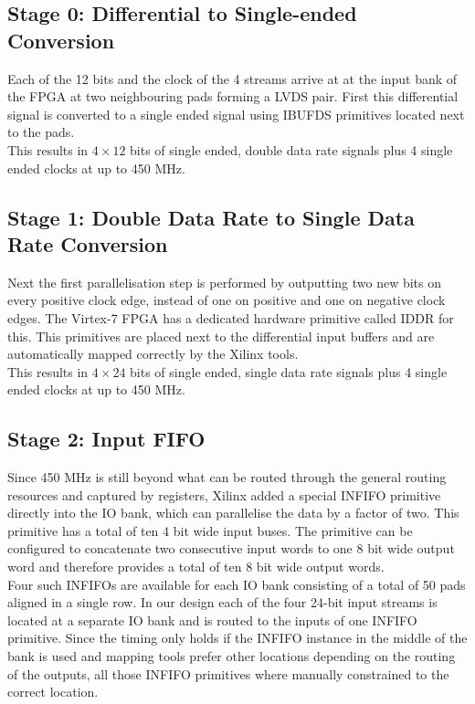 \subsection{Stage 0: Differential to Single-ended Conversion}
Each of the 12 bits and the clock of the 4 streams arrive at at the input bank
of the \gls{FPGA} at two neighbouring pads forming a \gls{LVDS} pair.
First this differential signal is converted to a single ended signal using
\gls{IBUFDS} primitives located next
to the pads. \\

This results in $4 \times 12$ bits of single ended, double data rate
signals plus 4 single ended clocks at up to 450 MHz. \\

\subsection{Stage 1: Double Data Rate to Single Data Rate Conversion}
\label{sec:fpga_adc_s1}
Next the first parallelisation step is performed by outputting two new
bits on every positive clock edge, instead of one on positive and one on
negative clock edges. The Virtex-7 \gls{FPGA} has a dedicated hardware
primitive called \gls{IDDR} for this.
This primitives are placed next to the differential input buffers
and are automatically mapped correctly by the Xilinx tools. \\

This results in $4 \times 24$ bits of single ended, single data rate
signals plus 4 single ended clocks at up to 450 MHz. \\

\subsection{Stage 2: Input FIFO}
Since 450 MHz is still beyond what can be routed through the general
routing resources and captured by registers, Xilinx added a special
\gls{INFIFO} primitive directly into the \gls{IO} bank,
which can parallelise the data by a factor of two.
This primitive has a total of ten 4 bit wide input buses.
The primitive can be configured to concatenate two consecutive input words
to one 8 bit wide output word and therefore provides a total of
ten 8 bit wide output words. \\

Four such \glspl{INFIFO} are available for each
\gls{IO} bank consisting of a total of 50 pads aligned in a single row.
In our design each of the four 24-bit input streams is located at a separate
\gls{IO} bank and is routed to the inputs of one \gls{INFIFO} primitive.
Since the timing only holds if the \gls{INFIFO} instance in the middle of the
bank is used and mapping tools prefer other locations depending on the
routing of the outputs, all those \gls{INFIFO} primitives where manually
constrained to the correct location. \\

